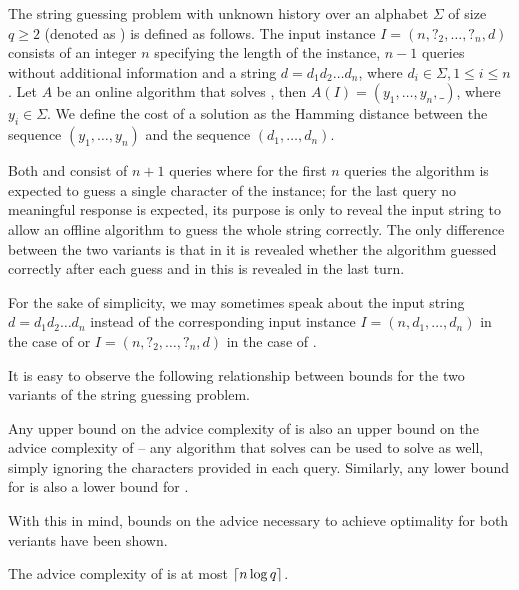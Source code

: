 \begin{definition}
    The string guessing problem with unknown history over an alphabet
    $\Sigma$ of size $q \geq 2$ (denoted as ) is defined as
    follows. The input instance $I = (n, ?_2, \dots, ?_n, d)$ consists of
    an integer $n$ specifying the length of the instance, $n-1$ queries
    without additional information and a string $d = d_1d_2\dots{}d_n$,
    where $d_i \in \Sigma, 1 \leq i \leq n$. Let $A$ be an online
    algorithm that solves , then $A(I) = (y_1, \dots, y_n, \_)$,
    where $y_i \in \Sigma$. We define the cost of a solution as the
    Hamming distance between the sequence $(y_1, \dots, y_n)$ and the
    sequence $(d_1, \dots, d_n)$.
\end{definition}

Both  and  consist of $n + 1$ queries where for the first
$n$ queries the algorithm is expected to guess a single character of the
instance; for the last query no meaningful response is expected, its
purpose is only to reveal the input string to allow an offline algorithm
to guess the whole string correctly. The only difference between the two
variants is that in  it is revealed whether the algorithm guessed
correctly after each guess and in  this is revealed in the last
turn.

For the sake of simplicity, we may sometimes speak about the input string
$d = d_1d_2\dots{}d_n$ instead of the corresponding input instance $I =
(n, d_1, \dots, d_n)$ in the case of  or $I = (n, ?_2, \dots, ?_n,
d)$ in the case of .

It is easy to observe the following relationship between bounds for the
two variants of the string guessing problem.

\begin{observation}\label{observation:sguh-sgkh-bounds}
    Any upper bound on the advice complexity of  is also an upper
    bound on the advice complexity of  -- any algorithm that
    solves  can be used to solve  as well, simply ignoring
    the characters provided in each query. Similarly, any lower bound for
     is also a lower bound for .
\end{observation}

With this in mind, bounds on the advice necessary to achieve optimality
for both veriants have been shown.

\begin{theorem}\label{theorem:sgkh-upper}\label{theorem:sguh-upper}
    The advice complexity of  is at most $\lceil n \log q\rceil$.
\end{theorem}


